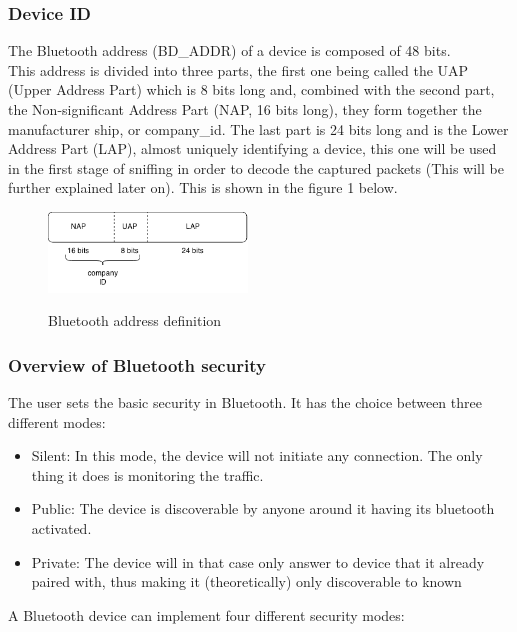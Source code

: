 \subsubsection{Device ID}

The Bluetooth address (BD\_ADDR) of a device is composed of 48 bits. \\

This address is divided into three parts, the first one being called the UAP (Upper Address Part) which is 8 bits long and, combined with the second part, the Non-significant Address Part (NAP, 16 bits long), they form together the manufacturer ship, or company\_id. The last part is 24 bits long and is the Lower Address Part (LAP), almost uniquely identifying a device, this one will be used in the first stage of sniffing in order to decode the captured packets (This will be further explained later on). This is shown in the figure 1 below.

\begin{figure}[!h]
  \begin{center}
	\includegraphics[width=200px]{images/bd_addr.png}
	\label{Bluetooth address}
	\caption{Bluetooth address definition}
  \end{center}
\end{figure}
\newpage
\subsubsection{Overview of Bluetooth security}

The user sets the basic security in Bluetooth. It has the choice between three different modes:
\begin{itemize}
 	\item Silent: In this mode, the device will not initiate any connection. The only thing it does is monitoring the traffic.
 	\item Public: The device is discoverable by anyone around it having its bluetooth activated.
 	\item Private: The device will in that case only answer to device that it already paired with, thus making it (theoretically) only discoverable to known 
\end{itemize}

\noindent A Bluetooth device can implement four different security modes:

